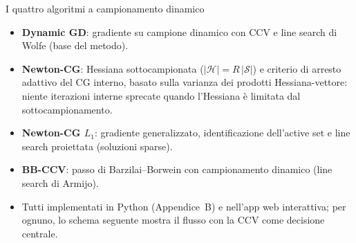\documentclass[aspectratio=169,11pt]{beamer}
\begin{document}
\begin{frame}{I quattro algoritmi a campionamento dinamico}
  \begin{itemize}
    \item \textbf{Dynamic GD}: gradiente su campione dinamico con CCV e line
      search di Wolfe (base del metodo).
    \item \textbf{Newton-CG}: Hessiana sottocampionata
      ($|\mathcal{H}|=R\,|\mathcal{S}|$) e criterio di arresto adattivo del
      CG interno, basato sulla varianza dei prodotti Hessiana-vettore: niente
      iterazioni interne sprecate quando l'Hessiana è limitata dal
      sottocampionamento.
    \item \textbf{Newton-CG $L_1$}: gradiente generalizzato, identificazione
      dell'active set e line search proiettata (soluzioni sparse).
    \item \textbf{BB-CCV}: passo di Barzilai--Borwein con campionamento
      dinamico (line search di Armijo).
    \item Tutti implementati in Python (Appendice~B) e nell'app web
      interattiva; per ognuno, lo schema seguente mostra il flusso con la
      CCV come decisione centrale.
  \end{itemize}
\end{frame}
\end{document}
